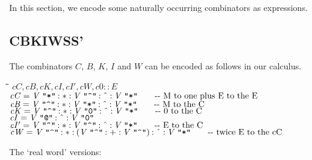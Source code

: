 \documentclass{article}
\newlength{\lwidth}\setlength{\lwidth}{4.5cm}
\newlength{\cwidth}\setlength{\cwidth}{8mm} %
\newcommand{\Conid}[1]{\mathit{#1}}
\newcommand{\Varid}[1]{\mathit{#1}}
\begin{document}
In this section, we encode some naturally occurring
combinators as expressions.

\subsection{CBKIWSS'}

The combinators \ensuremath{\Conid{C}}, \ensuremath{\Conid{B}}, \ensuremath{\Conid{K}}, \ensuremath{\Conid{I}} and \ensuremath{\Conid{W}} can be encoded
as follows in our calculus.
\begin{tabbing}
\qquad\=\hspace{\lwidth}\=\hspace{\cwidth}\=\+\kill
${\Varid{cC},\Varid{cB},\Varid{cK},\Varid{cI},\Varid{cI'},\Varid{cW},\Varid{c0}\mathbin{::}\Conid{E}}$\\
${\Varid{cC}\mathrel{=}\Conid{V}\;\text{\ttfamily \char34 *\char34}\mathbin{:*:}\Conid{V}\;\text{\ttfamily \char34 \char94 \char34}\mathbin{:\char94 :}\Conid{V}\;\text{\ttfamily \char34 *\char34}\mbox{\qquad-{}-  M to one plus E to the E }}$\\
${\Varid{cB}\mathrel{=}\Conid{V}\;\text{\ttfamily \char34 \char94 \char34}\mathbin{:*:}\Conid{V}\;\text{\ttfamily \char34 *\char34}\mathbin{:\char94 :}\Conid{V}\;\text{\ttfamily \char34 *\char34}\mbox{\qquad-{}-  M to the C}}$\\
${\Varid{cK}\mathrel{=}\Conid{V}\;\text{\ttfamily \char34 \char94 \char34}\mathbin{:*:}\Conid{V}\;\text{\ttfamily \char34 0\char34}\mathbin{:\char94 :}\Conid{V}\;\text{\ttfamily \char34 *\char34}\mbox{\qquad-{}-  0 to the C}}$\\
${\Varid{cI}\mathrel{=}\Conid{V}\;\text{\ttfamily \char34 @\char34}\mathbin{:\char94 :}\Conid{V}\;\text{\ttfamily \char34 0\char34}}$\\
${\Varid{cI'}\mathrel{=}\Conid{V}\;\text{\ttfamily \char34 \char94 \char34}\mathbin{:*:}\Conid{V}\;\text{\ttfamily \char34 \char94 \char34}\mathbin{:\char94 :}\Conid{V}\;\text{\ttfamily \char34 *\char34}\mbox{\qquad-{}-  E to the C}}$\\
${\Varid{cW}\mathrel{=}\Conid{V}\;\text{\ttfamily \char34 \char94 \char34}\mathbin{:*:}(\Conid{V}\;\text{\ttfamily \char34 \char94 \char34}\mathbin{:+:}\Conid{V}\;\text{\ttfamily \char34 \char94 \char34})\mathbin{:\char94 :}\Conid{V}\;\text{\ttfamily \char34 *\char34}\mbox{\qquad-{}-  twice E to the cC}}$
\end{tabbing}
The `real word' versions:
\end{document}
